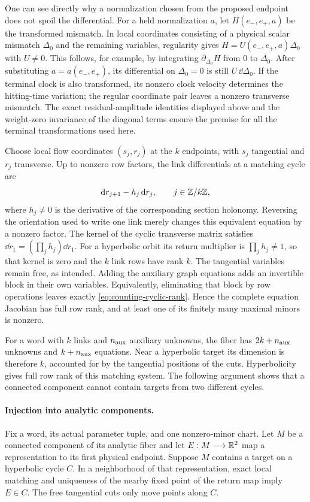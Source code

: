 One can see directly why a normalization chosen from the proposed
endpoint does not spoil the differential.  For a held normalization
$a$, let $H(e_-,e_+,a)$ be the transformed mismatch.  In local
coordinates consisting of a physical scalar mismatch $\Delta_0$
and the remaining variables, regularity gives
$H=U(e_-,e_+,a)\Delta_0$ with $U\ne0$.  This follows, for example,
by integrating $\partial_{\Delta_0}H$ from $0$ to $\Delta_0$.
After substituting $a=a(e_-,e_+)$, its differential on
$\Delta_0=0$ is still $U\,\dd\Delta_0$.
If the terminal clock is also transformed, its nonzero clock
velocity determines the hitting-time variation; the regular
coordinate pair leaves a nonzero transverse mismatch.  The exact
residual-amplitude identities displayed above and the weight-zero
invariance of the diagonal terms ensure the premise for all the
terminal transformations used here.

Choose local flow coordinates $(s_j,r_j)$ at the $k$ endpoints,
with $s_j$ tangential and $r_j$ transverse.  Up to nonzero row
factors, the link differentials at a matching cycle are
\begin{equation}\label{eq:counting-cyclic-rank}
 \mathrm{d} r_{j+1}-h_j\,\mathrm{d} r_j,
 \qquad j\in\mathbb{Z}/k\mathbb{Z},
\end{equation}
where $h_j\ne0$ is the derivative of the corresponding section
holonomy.  Reversing the orientation used to write one link merely
changes this equivalent equation by a nonzero factor.  The kernel
of the cyclic transverse matrix satisfies
$\dd r_1=(\prod_j h_j)\dd r_1$.  For a hyperbolic orbit its return
multiplier is $\prod_j h_j\ne1$, so that kernel is zero and the
$k$ link rows have rank $k$.  The tangential variables remain free,
as intended.  Adding the auxiliary graph equations adds an
invertible block in their own variables.  Equivalently, eliminating
that block by row operations leaves exactly
\eqref{eq:counting-cyclic-rank}.  Hence the complete equation
Jacobian has full row rank, and at least one of its finitely many
maximal minors is nonzero.

For a word with $k$ links and $n_{\rm aux}$ auxiliary unknowns, the
fiber has $2k+n_{\rm aux}$ unknowns and $k+n_{\rm aux}$ equations.
Near a hyperbolic target its dimension is therefore $k$, accounted
for by the tangential positions of the cuts.  Hyperbolicity gives
full row rank of this matching system.  The following argument shows
that a connected component cannot contain targets from two different
cycles.

\paragraph{Injection into analytic components.}
Fix a word, its actual parameter tuple, and one nonzero-minor chart.
Let $M$ be a connected component of its analytic fiber and let
$E:M\longrightarrow\mathbb{R}^2$ map a representation to its first
physical endpoint.  Suppose $M$ contains a target on a hyperbolic
cycle $C$.  In a neighborhood of that representation, exact local
matching and uniqueness of the nearby fixed point of the return
map imply $E\in C$.  The free tangential cuts only move points
along $C$.

